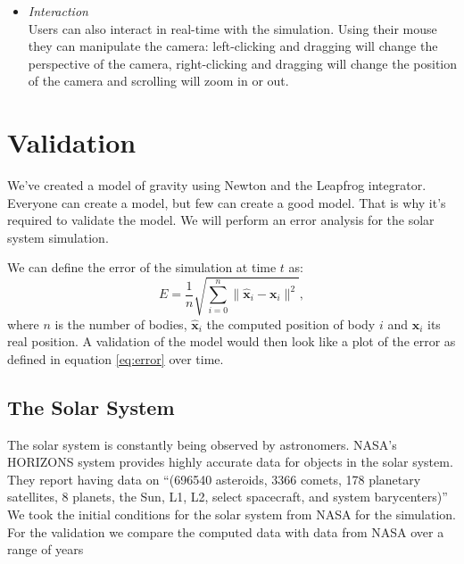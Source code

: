 \documentclass[a4paper]{article}
\newcommand{\vect}[1]{\boldsymbol{#1}}
\begin{document}
\begin{itemize}
\item \emph{Interaction}\\
  Users can also interact in real-time with the simulation. Using their mouse they can manipulate
  the camera: left-clicking and dragging will change the perspective of the camera, right-clicking
  and dragging will change the position of the camera and scrolling will zoom in or out.

\end{itemize}


\section{Validation}
We've created a model of gravity using Newton and the Leapfrog integrator. Everyone can create a
model, but few can create a good model. That is why it's required to validate the model. We will
perform an error analysis for the solar system simulation.

We can define the error of the simulation at time $t$ as:
\begin{equation} \label{eq:error}
E = \frac{1}{n} \sqrt{ \sum_{i=0}^{n} \|\hat{\vect{x}}_i - \vect{x}_i\|^2},
\end{equation}
where $n$ is the number of bodies, $\hat{\vect{x}}_i$ the computed position of body $i$ and
$\vect{x}_i$ its real position. A validation of the model would then look like a plot of the error
as defined in equation \ref{eq:error} over time.

\subsection{The Solar System} 
The solar system is constantly being observed by astronomers. NASA's HORIZONS system provides highly
accurate data for objects in the solar system. They report having data on ``(696540 asteroids, 3366
comets, 178 planetary satellites, 8 planets, the Sun, L1, L2, select spacecraft, and system
barycenters)'' \cite{stan} We took the initial conditions for the solar system from NASA for the
simulation. For the validation we compare the computed data with data from NASA over a range of
years
\end{document}
